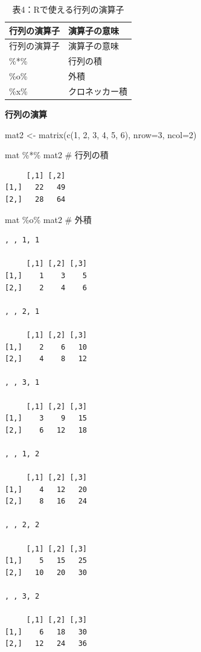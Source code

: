 \documentclass[
  letterpaper,
  DIV=11,
  numbers=noendperiod]{scrreprt}
\newenvironment{Shaded}{\begin{snugshade}}{\end{snugshade}}
\newcommand{\AttributeTok}[1]{\textcolor[rgb]{0.40,0.45,0.13}{#1}}
\newcommand{\CommentTok}[1]{\textcolor[rgb]{0.37,0.37,0.37}{#1}}
\newcommand{\DecValTok}[1]{\textcolor[rgb]{0.68,0.00,0.00}{#1}}
\newcommand{\FunctionTok}[1]{\textcolor[rgb]{0.28,0.35,0.67}{#1}}
\newcommand{\NormalTok}[1]{\textcolor[rgb]{0.00,0.23,0.31}{#1}}
\newcommand{\OtherTok}[1]{\textcolor[rgb]{0.00,0.23,0.31}{#1}}
\newcommand{\SpecialCharTok}[1]{\textcolor[rgb]{0.37,0.37,0.37}{#1}}
\begin{document}
\begin{longtable}[]{@{}ll@{}}
\caption{表4：Rで使える行列の演算子}\tabularnewline
\toprule()
行列の演算子 & 演算子の意味 \\
\midrule()
\endfirsthead
\toprule()
行列の演算子 & 演算子の意味 \\
\midrule()
\endhead
\%*\% & 行列の積 \\
\%o\% & 外積 \\
\%x\% & クロネッカー積 \\
\bottomrule()
\end{longtable}

\textbf{行列の演算}

\begin{Shaded}
\begin{Highlighting}[]
\NormalTok{mat2 }\OtherTok{\textless{}{-}} \FunctionTok{matrix}\NormalTok{(}\FunctionTok{c}\NormalTok{(}\DecValTok{1}\NormalTok{, }\DecValTok{2}\NormalTok{, }\DecValTok{3}\NormalTok{, }\DecValTok{4}\NormalTok{, }\DecValTok{5}\NormalTok{, }\DecValTok{6}\NormalTok{), }\AttributeTok{nrow=}\DecValTok{3}\NormalTok{, }\AttributeTok{ncol=}\DecValTok{2}\NormalTok{)}

\NormalTok{mat }\SpecialCharTok{\%*\%}\NormalTok{ mat2 }\CommentTok{\# 行列の積}
\end{Highlighting}
\end{Shaded}

\begin{verbatim}
     [,1] [,2]
[1,]   22   49
[2,]   28   64
\end{verbatim}

\begin{Shaded}
\begin{Highlighting}[]
\NormalTok{mat }\SpecialCharTok{\%o\%}\NormalTok{ mat2 }\CommentTok{\# 外積}
\end{Highlighting}
\end{Shaded}

\begin{verbatim}
, , 1, 1

     [,1] [,2] [,3]
[1,]    1    3    5
[2,]    2    4    6

, , 2, 1

     [,1] [,2] [,3]
[1,]    2    6   10
[2,]    4    8   12

, , 3, 1

     [,1] [,2] [,3]
[1,]    3    9   15
[2,]    6   12   18

, , 1, 2

     [,1] [,2] [,3]
[1,]    4   12   20
[2,]    8   16   24

, , 2, 2

     [,1] [,2] [,3]
[1,]    5   15   25
[2,]   10   20   30

, , 3, 2

     [,1] [,2] [,3]
[1,]    6   18   30
[2,]   12   24   36
\end{verbatim}
\end{document}
